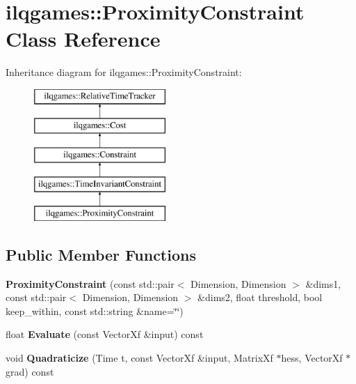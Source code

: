 \hypertarget{classilqgames_1_1_proximity_constraint}{}\section{ilqgames\+:\+:Proximity\+Constraint Class Reference}
\label{classilqgames_1_1_proximity_constraint}
Inheritance diagram for ilqgames\+:\+:Proximity\+Constraint\+:\begin{figure}[H]
\begin{center}
\leavevmode
\includegraphics[height=5.000000cm]{classilqgames_1_1_proximity_constraint}
\end{center}
\end{figure}
\subsection*{Public Member Functions}
\begin{DoxyCompactItemize}
\item 
{\bfseries Proximity\+Constraint} (const std\+::pair$<$ Dimension, Dimension $>$ \&dims1, const std\+::pair$<$ Dimension, Dimension $>$ \&dims2, float threshold, bool keep\+\_\+within, const std\+::string \&name=\char`\"{}\char`\"{})\hypertarget{classilqgames_1_1_proximity_constraint_a12c40563e0cd9e463361ccd582bed92c}{}\label{classilqgames_1_1_proximity_constraint_a12c40563e0cd9e463361ccd582bed92c}

\item 
float {\bfseries Evaluate} (const Vector\+Xf \&input) const \hypertarget{classilqgames_1_1_proximity_constraint_a882757ea9fe67910233ee82db2835549}{}\label{classilqgames_1_1_proximity_constraint_a882757ea9fe67910233ee82db2835549}

\item 
void {\bfseries Quadraticize} (Time t, const Vector\+Xf \&input, Matrix\+Xf $\ast$hess, Vector\+Xf $\ast$grad) const \hypertarget{classilqgames_1_1_proximity_constraint_ad5d97be9c41c5f6b9413e6af89b3e30e}{}\label{classilqgames_1_1_proximity_constraint_ad5d97be9c41c5f6b9413e6af89b3e30e}

\end{DoxyCompactItemize}
